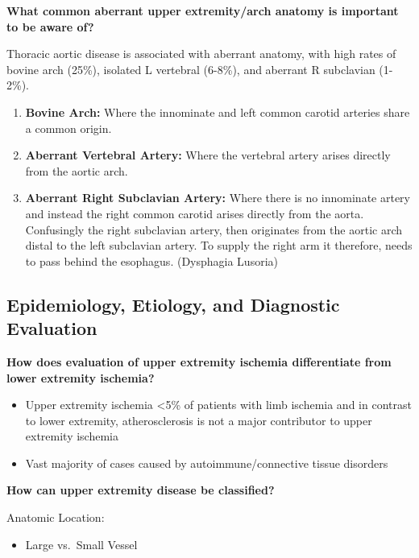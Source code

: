 \documentclass[
]{book}
\providecommand{\tightlist}{%
  \setlength{\itemsep}{0pt}\setlength{\parskip}{0pt}}
\begin{document}
\textbf{What common aberrant upper extremity/arch anatomy is important to be
aware of?}

Thoracic aortic disease is associated with aberrant anatomy, with high
rates of bovine arch (25\%), isolated L vertebral (6-8\%), and aberrant R
subclavian (1-2\%).\citep{dumfarth2015}

\begin{enumerate}
\def\labelenumi{\arabic{enumi}.}
\item
  \textbf{Bovine Arch:} Where the innominate and left common carotid
  arteries share a common origin.\citep{layton2006}
\item
  \textbf{Aberrant Vertebral Artery:} Where the vertebral artery arises
  directly from the aortic arch.
\item
  \textbf{Aberrant Right Subclavian Artery:} Where there is no innominate
  artery and instead the right common carotid arises directly from the
  aorta. Confusingly the right subclavian artery, then originates from
  the aortic arch distal to the left subclavian artery. To supply the
  right arm it therefore, needs to pass behind the esophagus.
  (Dysphagia Lusoria)
\end{enumerate}

\hypertarget{epidemiology-etiology-and-diagnostic-evaluation}{%
\subsection{Epidemiology, Etiology, and Diagnostic Evaluation}\label{epidemiology-etiology-and-diagnostic-evaluation}}

\textbf{How does evaluation of upper extremity ischemia differentiate from
lower extremity ischemia?}

\begin{itemize}
\item
  Upper extremity ischemia \textless5\% of patients with limb ischemia and in
  contrast to lower extremity, atherosclerosis is not a major
  contributor to upper extremity ischemia\citep{shuja117UpperExtremity}
\item
  Vast majority of cases caused by autoimmune/connective tissue
  disorders
\end{itemize}

\textbf{How can upper extremity disease be classified?}

Anatomic Location:

\begin{itemize}
\tightlist
\item
  Large vs.~Small Vessel
\end{itemize}
\end{document}
